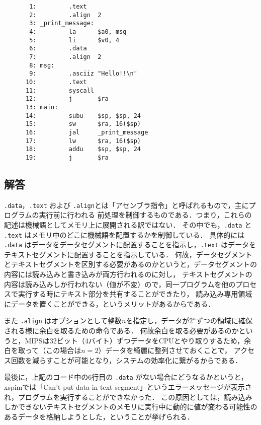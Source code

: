 \documentclass[a4j,11pt]{jarticle}
\begin{document}
\begin{verbatim}
       1:         .text
       2:         .align  2
       3: _print_message:
       4:         la      $a0, msg
       5:         li      $v0, 4
       6:         .data
       7:         .align  2
       8: msg:
       9:         .asciiz "Hello!!\n"
      10:         .text
      11:         syscall
      12:         j       $ra
      13: main:
      14:         subu    $sp, $sp, 24
      15:         sw      $ra, 16($sp)
      16:         jal     _print_message
      17:         lw      $ra, 16($sp)
      18:         addu    $sp, $sp, 24
      19:         j       $ra
\end{verbatim}

\subsection{解答}

{\tt.data}，{\tt.text} および {\tt.align}とは「アセンブラ指令」と呼ばれるもので，主にプログラムの実行前に行われる
前処理を制御するものである．つまり，これらの記述は機械語としてメモリ上に展開される訳ではない．
その中でも，{\tt.data} と {\tt.text} はメモリ中のどこに機械語を配置するかを制御している．
具体的には {\tt.data} はデータをデータセグメントに配置することを指示し，{\tt.text} はデータをテキストセグメントに配置することを指示している．
何故，データセグメントとテキストセグメントを区別する必要があるのかというと，データセグメントの内容には読み込みと書き込みが両方行われるのに対し，
テキストセグメントの内容は読み込みしか行われない（値が不変）ので，同一プログラムを他のプロセスで実行する時にテキスト部分を共有することができたり，
読み込み専用領域にデータを置くことができる，というメリットがあるからである．

また {\tt.align} はオプションとして整数$n$を指定し，データが$2^{n}$ずつの領域に確保される様に余白を取るための命令である．
何故余白を取る必要があるのかというと，MIPSは32ビット（4バイト）ずつデータをCPUとやり取りするため，余白を取って（この場合は$n = 2$）データを綺麗に整列させておくことで，
アクセス回数を減らすことが可能となり，システムの効率化に繋がるからである．

最後に，上記のコード中の6行目の {\tt.data} がない場合にどうなるかというと，xspimでは「Can't put data in text segment」というエラーメッセージが表示され，プログラムを実行することができなかった．
この原因としては，読み込みしかできないテキストセグメントのメモリに実行中に動的に値が変わる可能性のあるデータを格納しようとした，ということが挙げられる．

\end{document}
